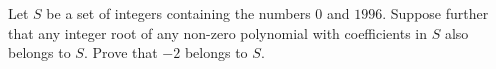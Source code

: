 Let $S$ be a set of integers containing the numbers $0$ and $1996$. Suppose further that any integer root of any non-zero polynomial with coefficients in $S$ also belongs to $S$. Prove that $-2$ belongs to $S$.